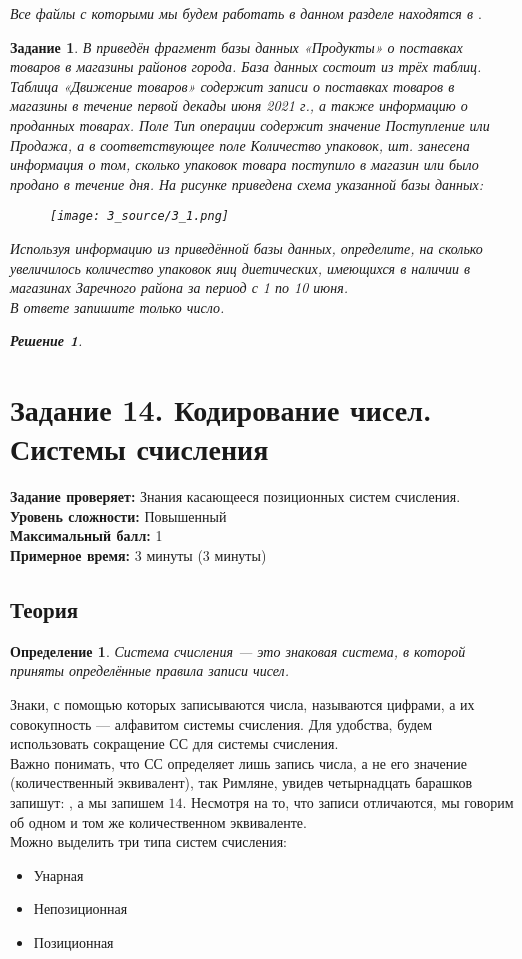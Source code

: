 \documentclass[12pt]{article}
\newtheorem{definition}{Определение}[section]
\theoremstyle{problem_style}
\newtheorem{problem}{Задание}[subsection]
\newtheorem{solution}{Решение}[subsection]
\begin{document}
\textit{Все файлы с которыми мы будем работать в данном разделе находятся в \href{run:\PThreeSource}{\texttt{\PThreeSource}}}.
\begin{problem}
В  приведён фрагмент базы данных «Продукты» о поставках товаров в магазины районов города. База данных состоит из трёх таблиц.\\
Таблица «Движение товаров» содержит записи о поставках товаров в магазины в течение первой декады июня 2021 г., а также информацию о проданных товарах. Поле Тип операции содержит значение Поступление или Продажа, а в соответствующее поле Количество упаковок, шт. занесена информация о том, сколько упаковок товара поступило в магазин или было продано в течение дня. На рисунке приведена схема указанной базы данных:
\begin{figure}[H]
    \centering
    \texttt{[image: 3\_source/3\_1.png]}
\end{figure}
Используя информацию из приведённой базы данных, определите, на сколько увеличилось количество упаковок яиц диетических, имеющихся в наличии в магазинах Заречного района за период с 1 по 10 июня.\\
В ответе запишите только число.
\begin{solution}

\end{solution}
\end{problem}

\newpage
\section{Задание 14. Кодирование чисел. Системы счисления}
\textbf{Задание проверяет:}
Знания касающееся позиционных систем счисления.\\
\textbf{Уровень сложности:}
Повышенный\\
\textbf{Максимальный балл:}
1\\
\textbf{Примерное время:}
3 минуты (3 минуты)

\subsection{Теория}
\begin{definition}
Система счисления — это знаковая система, в которой приняты определённые правила записи чисел.    
\end{definition}
Знаки, с помощью которых записываются числа, называются цифрами, а их совокупность — алфавитом системы счисления. Для удобства, будем использовать сокращение СС для системы счисления.\\
Важно понимать, что СС определяет лишь запись числа, а не его значение (количественный эквивалент), так Римляне, увидев четырнадцать барашков запишут: \MakeUppercase{}, а мы запишем $14$. Несмотря на то, что записи отличаются, мы говорим об одном и том же количественном эквиваленте.\\
Можно выделить три типа систем счисления:
\begin{itemize}
    \item Унарная
    \item Непозиционная
    \item Позиционная   
\end{itemize}
\end{document}
